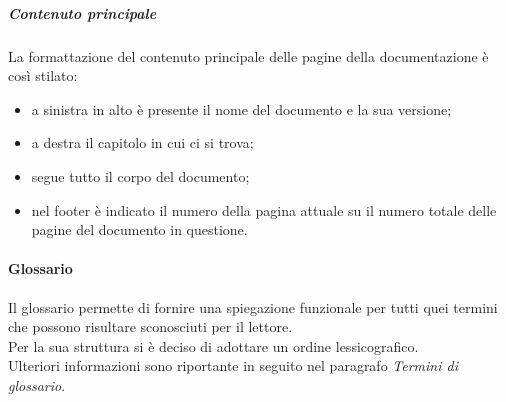 \subparagraph{Contenuto principale}
La formattazione del contenuto principale delle pagine della documentazione è così stilato:
\begin{itemize}
	\item a sinistra in alto è presente il nome del documento e la sua versione;
	\item a destra il capitolo in cui ci si trova;
	\item segue tutto il corpo del documento;
	\item nel footer è indicato il numero della pagina attuale su il numero totale delle pagine del documento in questione. 
\end{itemize}

\paragraph{Glossario}
Il glossario permette di fornire una spiegazione funzionale per tutti quei termini che possono risultare sconosciuti per il lettore.\\
Per la sua struttura si è deciso di adottare un ordine lessicografico.\\
Ulteriori informazioni sono riportante in seguito nel paragrafo \textit{Termini di glossario}.

